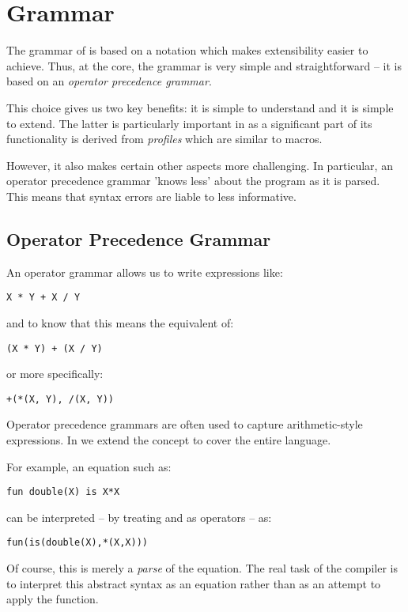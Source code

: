\chapter{Grammar}
\label{Grammar}
The grammar of \Sr is based on a notation which makes extensibility easier to achieve. Thus, at the core, the grammar is very simple and straightforward -- it is based on an \emph{operator precedence grammar}.
\begin{aside}
This choice gives us two key benefits: it is simple to understand and it is simple to extend. The latter is particularly important in \Sr as a significant part of its functionality is derived from \emph{profiles} which are similar to macros.

However, it also makes certain other aspects more challenging. In particular, an operator precedence grammar 'knows less' about the program as it is parsed. This means that syntax errors are liable to less informative.
\end{aside}

\section{Operator Precedence Grammar}
An operator grammar allows us to write expressions like:
\begin{lstlisting}
X * Y + X / Y
\end{lstlisting}
and to know that this means the equivalent of:
\begin{lstlisting}
(X * Y) + (X / Y)
\end{lstlisting}
or more specifically:
\begin{lstlisting}
+(*(X, Y), /(X, Y))
\end{lstlisting}
Operator precedence grammars are often used to capture arithm\-etic-style expressions. In \Sr we extend the concept to cover the entire language.

For example, an equation such as:
\begin{lstlisting}
fun double(X) is X*X
\end{lstlisting}
can be interpreted -- by treating  and  as operators -- as:
\begin{lstlisting}
fun(is(double(X),*(X,X)))
\end{lstlisting}
Of course, this is merely a \emph{parse} of the equation. The real task of the compiler is to interpret this abstract syntax as an equation rather than as an attempt to apply the  function.

